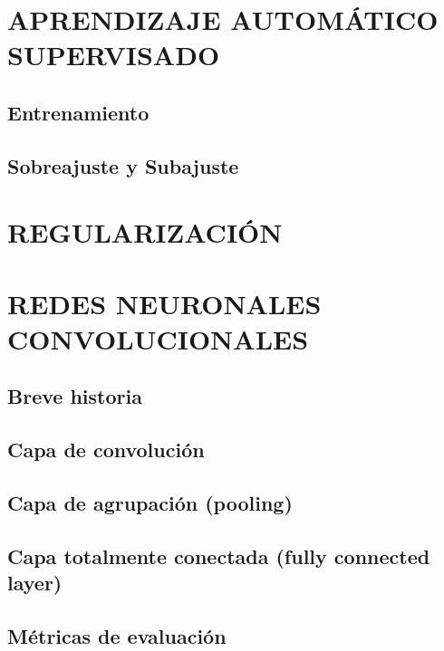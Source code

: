 \section{APRENDIZAJE AUTOMÁTICO SUPERVISADO}

\subsection{Entrenamiento}

\subsection{Sobreajuste y Subajuste}

\section{REGULARIZACIÓN}

\section{REDES NEURONALES CONVOLUCIONALES}

\subsection{Breve historia}

\subsection{Capa de convolución}

\subsection{Capa de agrupación (pooling)}

\subsection{Capa totalmente conectada (fully connected layer)}

\subsection{Métricas de evaluación}

%

